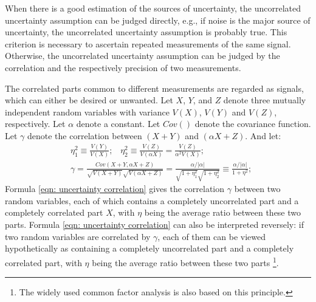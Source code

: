 \documentclass[twoside]{article}
\numberwithin{equation}{section}
\newcommand{\eqspace}{\;\;\;}
\begin{document}
When there is a good estimation of the sources of uncertainty, the uncorrelated uncertainty assumption can be judged directly, e.g., if noise \cite{Statistical_Methods}\cite{Precisions_Physical_Measurements} is the major source of uncertainty, the uncorrelated uncertainty assumption is probably true.  
This criterion is necessary to ascertain repeated measurements of the same signal.   
Otherwise, the uncorrelated uncertainty assumption can be judged by the correlation and the respectively precision of two measurements.  

The correlated parts common to different measurements are regarded as signals, which can either be desired or unwanted.
Let $X$, $Y$, and $Z$ denote three mutually independent random variables \cite{Probability_Statistics} with variance $V(X)$, $V(Y)$ and $V(Z)$, respectively.  
Let $\alpha$ denote a constant.  
Let $Cov()$ denote the covariance function.  
Let $\gamma$ denote the correlation between $(X + Y)$ and $(\alpha X + Z)$. And let:
\begin{align}
\label{eqn: uncertainty ratio}
& \eta _{1} ^{2} \equiv \frac{V(Y)}{V(X)}; \eqspace
 \eta _{2} ^{2} \equiv \frac{V(Z)}{V(\alpha X)} =\frac{V(Z)}{\alpha ^{2} V(X)};  \\
\label{eqn: uncertainty correlation}
& \gamma =\frac{Cov(X+Y,\alpha X+Z)}{\sqrt{V(X+Y)} \sqrt{V(\alpha X+Z)}}  =\frac{\alpha /|\alpha |}{\sqrt{1+\eta _{1} ^{2} } \sqrt{1+\eta _{2} ^{2}}} \equiv \frac{\alpha /|\alpha |}{1+\eta ^{2}};
\end{align}
Formula \eqref{eqn: uncertainty correlation} gives the correlation $\gamma$ between two random variables, each of which contains a completely uncorrelated part and a completely correlated part $X$, with $\eta$ being the average ratio between these two parts.  
Formula \eqref{eqn: uncertainty correlation} can also be interpreted reversely: if two random variables are correlated by $\gamma$, each of them can be viewed hypothetically as containing a completely uncorrelated part and a completely correlated part, with $\eta$ being the average ratio between these two parts \footnote{The widely used common factor analysis is also based on this principle.}.
\end{document}
